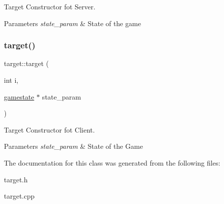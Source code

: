 Target Constructor fot Server. 


\begin{DoxyParams}{Parameters}
{\em state\+\_\+param} & State of the game \\
\hline
\end{DoxyParams}
\mbox{\label{classtarget_a091e064f965676275a1e86b09c3604b4}} 
\subsubsection{\texorpdfstring{target()}{target()}\hspace{0.1cm}{\footnotesize\ttfamily [2/2]}}
{\footnotesize\ttfamily target\+::target (\begin{DoxyParamCaption}\item[{int}]{i,  }\item[{\hyperlink{classgamestate}{gamestate} $\ast$}]{state\+\_\+param }\end{DoxyParamCaption})}



Target Constructor fot Client. 


\begin{DoxyParams}{Parameters}
{\em state\+\_\+param} & State of the Game \\
\hline
\end{DoxyParams}


The documentation for this class was generated from the following files\+:\begin{DoxyCompactItemize}
\item 
target.\+h\item 
target.\+cpp\end{DoxyCompactItemize}
